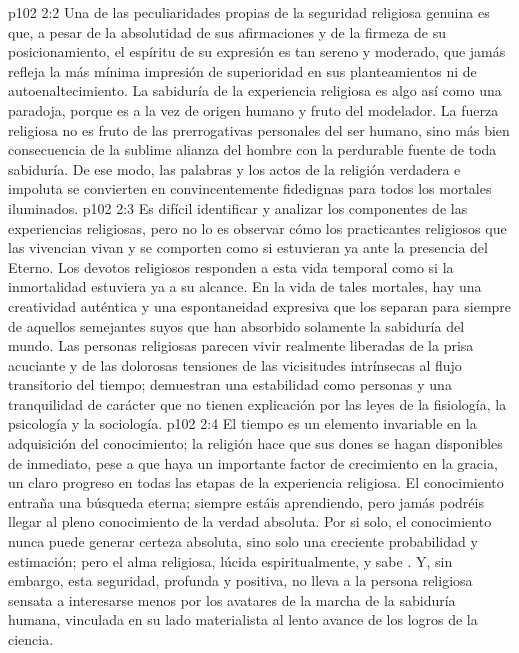 \vs p102 2:2 Una de las peculiaridades propias de la seguridad religiosa genuina es que, a pesar de la absolutidad de sus afirmaciones y de la firmeza de su posicionamiento, el espíritu de su expresión es tan sereno y moderado, que jamás refleja la más mínima impresión de superioridad en sus planteamientos ni de autoenaltecimiento. La sabiduría de la experiencia religiosa es algo así como una paradoja, porque es a la vez de origen humano y fruto del modelador. La fuerza religiosa no es fruto de las prerrogativas personales del ser humano, sino más bien consecuencia de la sublime alianza del hombre con la perdurable fuente de toda sabiduría. De ese modo, las palabras y los actos de la religión verdadera e impoluta se convierten en convincentemente fidedignas para todos los mortales iluminados.
\vs p102 2:3 Es difícil identificar y analizar los componentes de las experiencias religiosas, pero no lo es observar cómo los practicantes religiosos que las vivencian vivan y se comporten como si estuvieran ya ante la presencia del Eterno. Los devotos religiosos responden a esta vida temporal como si la inmortalidad estuviera ya a su alcance. En la vida de tales mortales, hay una creatividad auténtica y una espontaneidad expresiva que los separan para siempre de aquellos semejantes suyos que han absorbido solamente la sabiduría del mundo. Las personas religiosas parecen vivir realmente liberadas de la prisa acuciante y de las dolorosas tensiones de las vicisitudes intrínsecas al flujo transitorio del tiempo; demuestran una estabilidad como personas y una tranquilidad de carácter que no tienen explicación por las leyes de la fisiología, la psicología y la sociología.
\vs p102 2:4 \pc El tiempo es un elemento invariable en la adquisición del conocimiento; la religión hace que sus dones se hagan disponibles de inmediato, pese a que haya un importante factor de crecimiento en la gracia, un claro progreso en todas las etapas de la experiencia religiosa. El conocimiento entraña una búsqueda eterna; siempre estáis aprendiendo, pero jamás podréis llegar al pleno conocimiento de la verdad absoluta. Por si solo, el conocimiento nunca puede generar certeza absoluta, sino solo una creciente probabilidad y estimación; pero el alma religiosa, lúcida espiritualmente,  y sabe . Y, sin embargo, esta seguridad, profunda y positiva, no lleva a la persona religiosa sensata a interesarse menos por los avatares de la marcha de la sabiduría humana, vinculada en su lado materialista al lento avance de los logros de la ciencia.
